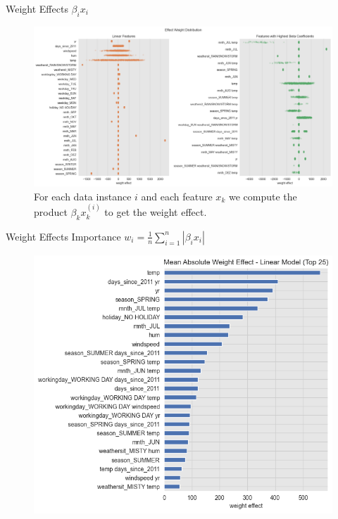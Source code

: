 \documentclass[10pt]{beamer}
\begin{document}
\begin{frame}{Weight Effects $\beta_{i}x_{i}$}
\begin{center}
  \begin{figure}
    \includegraphics[scale=0.3]{images/interpretable_ml_61_0.png}
    \caption{For each data instance $i$ and each feature $x_{k}$ we compute the product $\beta_{k}x^{(i)}_{k}$ to get the weight effect.}
  \end{figure}
\end{center}
\end{frame}

\begin{frame}{Weight Effects Importance $w_{i} = \frac{1}{n}\sum_{i=1}^{n}|\beta_{i}x_{i}|$}
\begin{center}
  \begin{figure}
    \includegraphics[scale=0.45]{images/interpretable_ml_62_0.png}
  \end{figure}
\end{center}
\end{frame}
\end{document}
